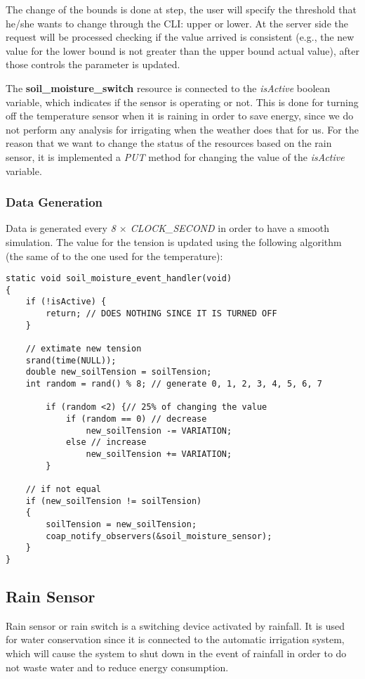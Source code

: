 The change of the bounds is done at step, the user will specify the threshold that he/she wants to change through the CLI: upper or lower. At the server side the request will be processed checking if the value arrived is consistent (e.g., the new value for the lower bound is not greater than the upper bound actual value), after those controls the parameter is updated.

The \textbf{soil\_moisture\_switch} resource is connected to the \textit{isActive} boolean variable, which indicates if the sensor is operating or not. This is done for turning off the temperature sensor when it is raining in order to save energy, since we do not perform any analysis for irrigating when the weather does that for us. For the reason that we want to change the status of the resources based on the rain sensor, it is implemented a \textit{PUT} method for changing the value of the \textit{isActive} variable.

\subsubsection{Data Generation}
Data is generated every \textit{8 $\times$ CLOCK\_SECOND} in order to have a smooth simulation. The value for the tension is updated using the following algorithm (the same of to the one used for the temperature):

\begin{lstlisting}
static void soil_moisture_event_handler(void)
{
    if (!isActive) {
        return; // DOES NOTHING SINCE IT IS TURNED OFF
    }
    
    // extimate new tension
    srand(time(NULL));
    double new_soilTension = soilTension;
    int random = rand() % 8; // generate 0, 1, 2, 3, 4, 5, 6, 7

        if (random <2) {// 25% of changing the value
            if (random == 0) // decrease
                new_soilTension -= VARIATION;
            else // increase
                new_soilTension += VARIATION;
        }
    
    // if not equal
    if (new_soilTension != soilTension)
    {
        soilTension = new_soilTension;
        coap_notify_observers(&soil_moisture_sensor);
    }
}
\end{lstlisting}



\subsection{Rain Sensor}
Rain sensor or rain switch is a switching device activated by rainfall. It is used for water conservation since it is connected to the automatic irrigation system, which will cause the system to shut down in the event of rainfall in order to do not waste water and to reduce energy consumption.

